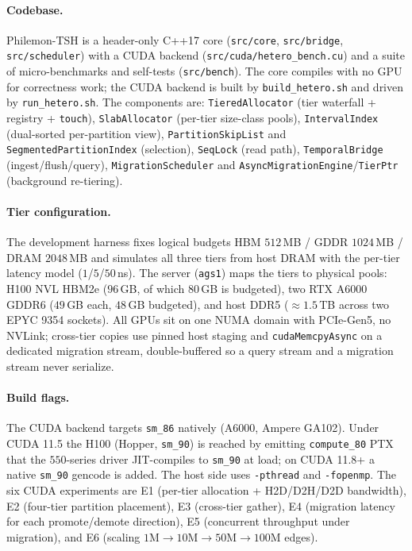\documentclass[10pt]{article}
\theoremstyle{definition}
\begin{document}
\paragraph{Codebase.}
Philemon-TSH is a header-only C++17 core (\texttt{src/core}, \texttt{src/bridge},
\texttt{src/scheduler}) with a CUDA backend (\texttt{src/cuda/hetero\_bench.cu}) and a
suite of micro-benchmarks and self-tests (\texttt{src/bench}). The core compiles with
no GPU for correctness work; the CUDA backend is built by \texttt{build\_hetero.sh}
and driven by \texttt{run\_hetero.sh}. The components are: \texttt{TieredAllocator}
(tier waterfall + registry + \texttt{touch}), \texttt{SlabAllocator} (per-tier
size-class pools), \texttt{IntervalIndex} (dual-sorted per-partition view),
\texttt{PartitionSkipList} and \texttt{SegmentedPartitionIndex} (selection),
\texttt{SeqLock} (read path), \texttt{TemporalBridge} (ingest/flush/query),
\texttt{MigrationScheduler} and \texttt{AsyncMigrationEngine}/\texttt{TierPtr}
(background re-tiering).

\paragraph{Tier configuration.}
The development harness fixes logical budgets HBM $512$\,MB / GDDR $1024$\,MB / DRAM
$2048$\,MB and simulates all three tiers from host DRAM with the per-tier latency
model ($1$/$5$/$50$\,ns). The server (\texttt{ags1}) maps the tiers to physical
pools: H100 NVL HBM2e ($96$\,GB, of which $80$\,GB is budgeted), two RTX A6000 GDDR6
($49$\,GB each, $48$\,GB budgeted), and host DDR5 ($\approx 1.5$\,TB across two EPYC
9354 sockets). All GPUs sit on one NUMA domain with PCIe-Gen5, no NVLink; cross-tier
copies use pinned host staging and \texttt{cudaMemcpyAsync} on a dedicated migration
stream, double-buffered so a query stream and a migration stream never serialize.

\paragraph{Build flags.}
The CUDA backend targets \texttt{sm\_86} natively (A6000, Ampere GA102). Under CUDA
11.5 the H100 (Hopper, \texttt{sm\_90}) is reached by emitting \texttt{compute\_80}
PTX that the $550$-series driver JIT-compiles to \texttt{sm\_90} at load; on CUDA
11.8+ a native \texttt{sm\_90} gencode is added. The host side uses
\texttt{-pthread} and \texttt{-fopenmp}. The six CUDA experiments are E1 (per-tier
allocation + H2D/D2H/D2D bandwidth), E2 (four-tier partition placement), E3 (cross-tier
gather), E4 (migration latency for each promote/demote direction), E5 (concurrent
throughput under migration), and E6 (scaling $1$M$\to$$10$M$\to$$50$M$\to$$100$M edges).
\end{document}
